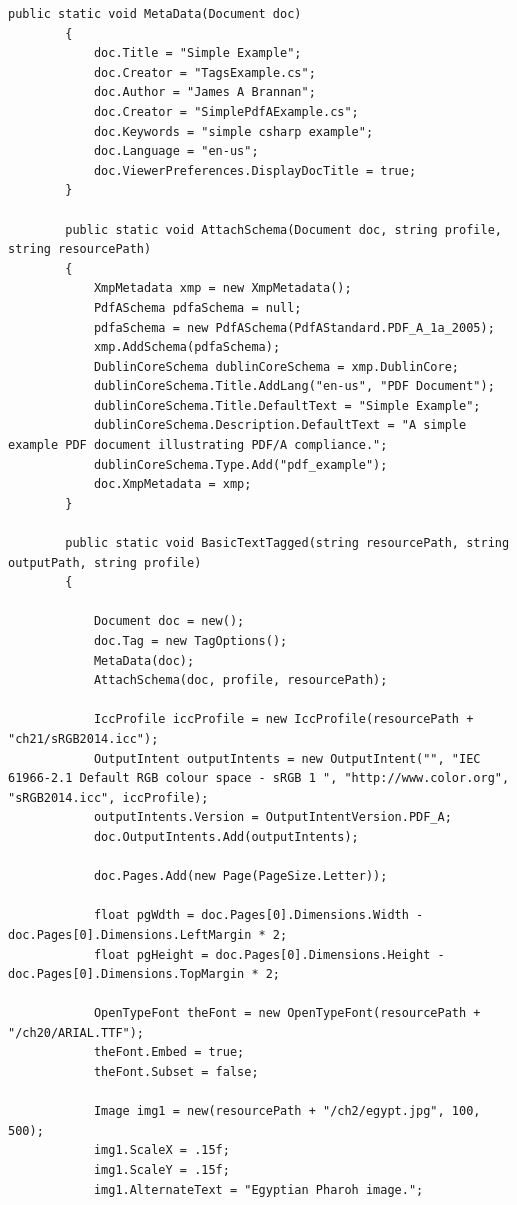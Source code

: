 \documentclass[american,letterpaper]{tufte-book}
\numberwithin{equation}{section}
\numberwithin{figure}{section}
\begin{document}
{{\begin{lstlisting}[caption={Creating a PDF/A-1a PDF document.},label={lis:Creating-a-PDF/A-1a-1},basicstyle={\small\ttfamily},breaklines=true]
        public static void MetaData(Document doc)
        {
            doc.Title = "Simple Example";
            doc.Creator = "TagsExample.cs";
            doc.Author = "James A Brannan";
            doc.Creator = "SimplePdfAExample.cs";
            doc.Keywords = "simple csharp example";
            doc.Language = "en-us";
            doc.ViewerPreferences.DisplayDocTitle = true;
        }

        public static void AttachSchema(Document doc, string profile, string resourcePath)
        {
            XmpMetadata xmp = new XmpMetadata();
            PdfASchema pdfaSchema = null;
            pdfaSchema = new PdfASchema(PdfAStandard.PDF_A_1a_2005);
            xmp.AddSchema(pdfaSchema);
            DublinCoreSchema dublinCoreSchema = xmp.DublinCore;
            dublinCoreSchema.Title.AddLang("en-us", "PDF Document");
            dublinCoreSchema.Title.DefaultText = "Simple Example";
            dublinCoreSchema.Description.DefaultText = "A simple example PDF document illustrating PDF/A compliance.";
            dublinCoreSchema.Type.Add("pdf_example");
            doc.XmpMetadata = xmp;
        }

        public static void BasicTextTagged(string resourcePath, string outputPath, string profile)
        {

            Document doc = new();
            doc.Tag = new TagOptions();
            MetaData(doc);
            AttachSchema(doc, profile, resourcePath);
                        
            IccProfile iccProfile = new IccProfile(resourcePath + "ch21/sRGB2014.icc");
            OutputIntent outputIntents = new OutputIntent("", "IEC 61966-2.1 Default RGB colour space - sRGB 1 ", "http://www.color.org", "sRGB2014.icc", iccProfile);
            outputIntents.Version = OutputIntentVersion.PDF_A;
            doc.OutputIntents.Add(outputIntents);

            doc.Pages.Add(new Page(PageSize.Letter));

            float pgWdth = doc.Pages[0].Dimensions.Width - doc.Pages[0].Dimensions.LeftMargin * 2;
            float pgHeight = doc.Pages[0].Dimensions.Height - doc.Pages[0].Dimensions.TopMargin * 2;

            OpenTypeFont theFont = new OpenTypeFont(resourcePath + "/ch20/ARIAL.TTF");
            theFont.Embed = true;
            theFont.Subset = false;

            Image img1 = new(resourcePath + "/ch2/egypt.jpg", 100, 500);
            img1.ScaleX = .15f;
            img1.ScaleY = .15f;
            img1.AlternateText = "Egyptian Pharoh image.";


\end{lstlisting}}}
\end{document}
